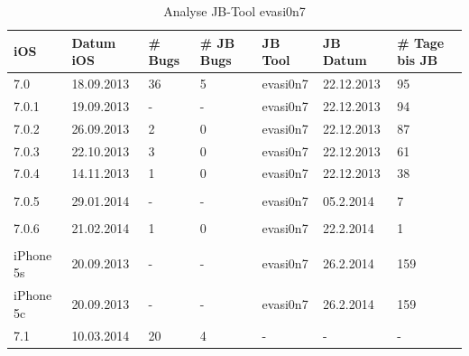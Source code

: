 \begin{table}[htp!]
    \begin{center}
        \begin{tabular}{| p{20mm} | p{18mm} | p{17mm} | p{25mm} | p{20mm} | p{22mm} | p{15mm} |} \hline
            \textbf{iOS} & \textbf{Datum iOS} & \textbf{\# Bugs} & \textbf{\# JB Bugs} & \textbf{JB Tool} & \textbf{JB Datum} & \textbf{\# Tage bis JB} \\ \hline 
7.0 & 18.09.2013 &	36 & 5 & evasi0n7 & 22.12.2013 & 95 \\ \hline
7.0.1 & 19.09.2013 & - & - & evasi0n7 & 22.12.2013 &  94 \\ \hline
7.0.2 & 26.09.2013 & 2 & 0 & evasi0n7 & 22.12.2013 & 87 \\ \hline
7.0.3 & 22.10.2013 & 3 & 0 & evasi0n7 & 22.12.2013 & 61\\ \hline
7.0.4 & 14.11.2013 & 1 & 0 & evasi0n7 & 22.12.2013 & 38 \\ \hline
 & & & & & & \\ \hline
7.0.5 & 29.01.2014 & - & - & evasi0n7 & 05.2.2014 & 7 \\ \hline
& & & & & & \\ \hline
7.0.6 & 21.02.2014 & 1 & 0 & evasi0n7 & 22.2.2014 & 1 \\ \hline
& & & & & & \\ \hline
iPhone 5s & 20.09.2013 & - & - & evasi0n7 & 26.2.2014 & 159 \\ \hline
iPhone 5c & 20.09.2013	& - & - & evasi0n7 & 26.2.2014 & 159 \\ \hline
7.1 & 10.03.2014 & 20 & 4 & - & - & - \\ \hline
        \end{tabular} 
        \caption{Analyse JB-Tool evasi0n7 \protect\footnotemark\protect\footnotemark}
        \label{tab:Analyseevasi0n7}
    \end{center}
\end{table}

